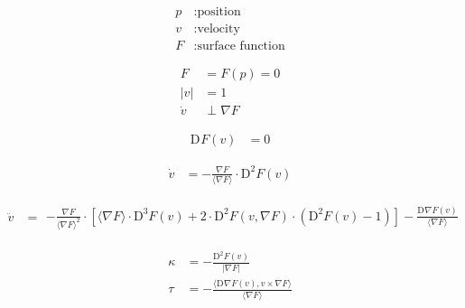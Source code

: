 \documentclass{scrartcl}
\newcommand{ \skap }[ 2 ]{ \langle #1, #2 \rangle }
\newcommand{ \skaq }[ 1 ]{ \langle #1 \rangle }
\newcommand{ \abs }[ 1 ]{ \lvert #1 \rvert }
\newcommand{ \mult }{ \cdot }
\newcommand{ \diff }[ 2 ]{ \mathrm{D}^{ #1 }#2 }
\newcommand{ \grad }[ 1 ]{ \nabla#1 }
\begin{document}
\begin{subequations}
\begin{align}
p  &:  \text{position}\\
v  &:  \text{velocity}\\
F  &:  \text{surface function}
\end{align}
\end{subequations}


\begin{subequations}
\begin{align}
F  &=  F( p )  =  0\\
\abs{ v }   &=   1\\
\dot{ v }  &\perp  \grad{ F }
\end{align}
\end{subequations}


\begin{align}
\diff{}{ F }( v )  &=  0
\end{align}


\begin{align}
\dot{ v }   &=  -\frac{ \grad{ F } }{ \skaq{ \grad{ F } } } \mult \diff{ 2 }{ F }( v )
\end{align}


\begin{align}
\ddot{ v }   &=
\begin{aligned}
- \frac{ \grad F }{    \skaq{ \grad F }^2 } \mult
  \left[    \skaq{ \grad{ F } } \mult \diff{ 3 }{ F }( v )
         +  2 \mult \diff{ 2 }{ F }( v, \grad{ F } ) \mult
            \left( \diff{ 2 }{ F }( v ) - 1 \right) \right]
-  \frac{ \diff{}{ \grad{ F } }( v ) }{ \skaq{ \grad{ F } } }
\end{aligned}
\end{align}


\begin{align}
\kappa   &=   -\frac{ \diff{ 2 }{ F }( v ) }{ \abs{ \grad{ F } } }\\
\tau     &=   -\frac{ \skap{ \diff{}{ \grad{ F } }( v ) }{ v \times \grad{ F } } }{ \skaq{ \grad{ F } } }
\end{align}
\end{document}
